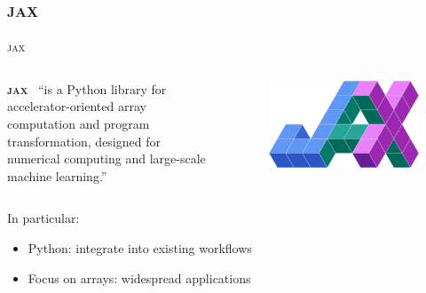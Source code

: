 \documentclass[usenames,dvipsnames,t]{beamer}
\newcommand{\ghlink}[1]{\href{https://github.com/#1}{\textcolor{black}{\faGithub}}}
\begin{document}
\subsection{\textsc{jax}}


\begin{frame}{\textsc{jax}}

  \def\x{5mm}
  \def\y{1mm}

  \begin{columns}
    \begin{column}{0.84\linewidth}
      \textbf{\textsc{jax}}~\ghlink{jax-ml/jax}
      ``is a Python library for accelerator-oriented array computation and program transformation, designed for  numerical computing and large-scale machine learning.''~\cite{jax2018github}
    \end{column}
    \begin{column}{0.15\linewidth}
      \begin{figure}
        \centering
        \includegraphics[width=0.95\linewidth]{Figures/jax.png}
      \end{figure}
    \end{column}
  \end{columns}

  \vspace{\x}

  In particular:
  \begin{itemize}
    \vspace{\y}
    \item Python: integrate into existing workflows

    \vspace{\y}

    \item Focus on arrays: widespread applications
    
    \vspace{\y}


\end{itemize}
\end{frame}
\end{document}
